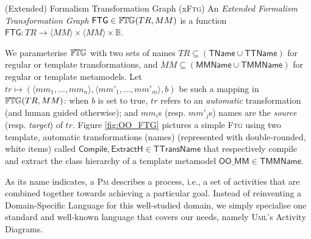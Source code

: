 \begin{Definition}{(Extended) Formalism Transformation Graph (x\textsc{Ftg})}
An \emph{Extended Formalism Transformation Graph} $\mathsf{FTG} \in \mathbb{F}\mskip-1mu\mathbb{T}\mskip-1mu\mathbb{G}(TR, 
MM)$ is a function  $\mathsf{FTG} \colon TR \to \langle MM \rangle \times 
\langle MM \rangle \times \mathbb{B}$.
\end{Definition}
\noindent
We parameterise $\mathbb{F}\mskip-1mu\mathbb{T}\mskip-1mu\mathbb{G}$ with two sets of names $TR\subseteq (\mathsf{TName}\cup 
\mathsf{TTName})$ for regular or template transformations, and $MM\subseteq 
(\mathsf{MMName} \cup \mathsf{TMMName})$ for regular or template metamodels. 
Let $tr \mapsto (\langle mm_1, \ldots, mm_n \rangle, \langle mm'_1, \ldots, 
mm'_m \rangle, b)$ be such a mapping in $\mathbb{F}\mskip-1mu\mathbb{T}\mskip-1mu\mathbb{G}(TR, MM)$: when $b$ is
set to true, $tr$ refers to an \emph{automatic} transformation (and human 
guided otherwise); and $mm_i$s (resp. $mm'_j$s) names are the \emph{source} 
(resp. \emph{target}) of $tr$.
%
%
Figure \ref{fig:OO_FTG} pictures a simple \textsc{Ftg} using two template, 
automatic transformations (names) (represented with double-rounded, white 
items) called $\mathsf{Compile}, \mathsf{ExtractH}\in 
\mathsf{TTransName}$ that respectively compile and extract the class hierarchy 
of a template metamodel $\mathsf{OO\_MM}\in\mathsf{TMMName}$. 

\medskip
As its name indicates, a \textsc{Pm} describes a process, i.e., a set of 
activities that are combined together towards achieving a particular goal. 
Instead of reinventing a Domain-Specific Language for this well-studied domain, 
we simply specialise one standard and well-known language that covers our 
needs, namely \textsc{Uml}'s Activity Diagrams.


